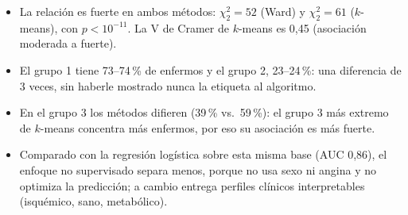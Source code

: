 \begin{itemize}[leftmargin=1.2em]
  \item[\color{cTeal}\faCheck] La relación es fuerte en ambos métodos: $\chi^2_2=52$ (Ward) y $\chi^2_2=61$
  ($k$-means), con $p<10^{-11}$. La V de Cramer de $k$-means es 0,45 (asociación moderada a fuerte).
  \item[\color{cTeal}\faCheck] El grupo 1 tiene 73--74\,\% de enfermos y el grupo 2, 23--24\,\%: una diferencia
  de 3 veces, sin haberle mostrado nunca la etiqueta al algoritmo.
  \item[\color{cRed}\faIcon{exchange-alt}] En el grupo 3 los métodos difieren (39\,\% vs.\ 59\,\%): el grupo 3 más
  extremo de $k$-means concentra más enfermos, por eso su asociación es más fuerte.
  \item[\color{cTeal}\faBalanceScale] Comparado con la regresión logística sobre esta misma base (AUC 0,86), el enfoque no supervisado separa
  menos, porque no usa sexo ni angina y no optimiza la predicción; a cambio entrega perfiles clínicos
  interpretables (isquémico, sano, metabólico).
\end{itemize}

